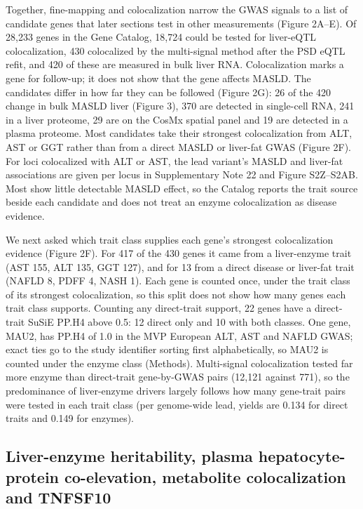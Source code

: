 Together, fine-mapping and colocalization narrow the GWAS signals to a list of candidate genes that later sections test in other measurements (Figure 2A--E). Of 28,233 genes in the Gene Catalog, 18,724 could be tested for liver-eQTL colocalization, 430 colocalized by the multi-signal method after the PSD eQTL refit, and 420 of these are measured in bulk liver RNA. Colocalization marks a gene for follow-up; it does not show that the gene affects MASLD. The candidates differ in how far they can be followed (Figure 2G): 26 of the 420 change in bulk MASLD liver (Figure 3), 370 are detected in single-cell RNA, 241 in a liver proteome, 29 are on the CosMx spatial panel and 19 are detected in a plasma proteome. Most candidates take their strongest colocalization from ALT, AST or GGT rather than from a direct MASLD or liver-fat GWAS (Figure 2F). For loci colocalized with ALT or AST, the lead variant's MASLD and liver-fat associations are given per locus in Supplementary Note 22 and Figure S2Z--S2AB. Most show little detectable MASLD effect, so the Catalog reports the trait source beside each candidate and does not treat an enzyme colocalization as disease evidence.

We next asked which trait class supplies each gene's strongest colocalization evidence (Figure 2F). For 417 of the 430 genes it came from a liver-enzyme trait (AST 155, ALT 135, GGT 127), and for 13 from a direct disease or liver-fat trait (NAFLD 8, PDFF 4, NASH 1). Each gene is counted once, under the trait class of its strongest colocalization, so this split does not show how many genes each trait class supports. Counting any direct-trait support, 22 genes have a direct-trait SuSiE PP.H4 above 0.5: 12 direct only and 10 with both classes. One gene, MAU2, has PP.H4 of 1.0 in the MVP European ALT, AST and NAFLD GWAS; exact ties go to the study identifier sorting first alphabetically, so MAU2 is counted under the enzyme class (Methods). Multi-signal colocalization tested far more enzyme than direct-trait gene-by-GWAS pairs (12,121 against 771), so the predominance of liver-enzyme drivers largely follows how many gene-trait pairs were tested in each trait class (per genome-wide lead, yields are 0.134 for direct traits and 0.149 for enzymes).

\subsection{Liver-enzyme heritability, plasma hepatocyte-protein co-elevation, metabolite colocalization and TNFSF10}\label{liver-enzyme-heritability-plasma-protein-metabolite-tnfsf10}

